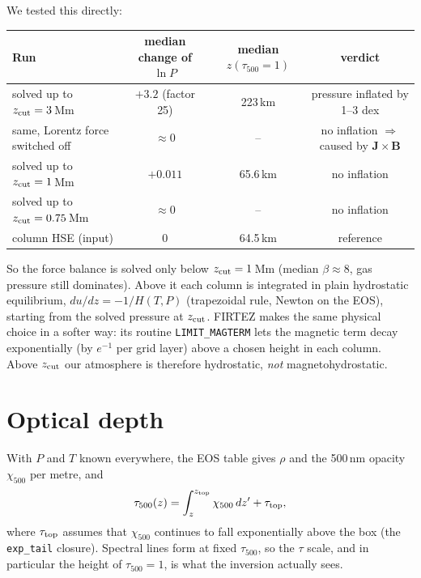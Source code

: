 \documentclass[10pt]{extarticle}
\newcommand{\B}{\mathbf B}\newcommand{\J}{\mathbf J}\newcommand{\F}{\mathbf F}\newcommand{\zh}{\hat{\mathbf z}}
\begin{document}
We tested this directly:
\begin{center}
\begin{tabular}{lccc}
\toprule
Run & median change of $\ln P$ & median $z(\tau_{500}=1)$ & verdict \\ \midrule
solved up to $z_{\rm cut}=3$\,Mm & $+3.2$ (factor 25) & 223\,km & pressure inflated by 1--3 dex \\
same, Lorentz force switched off & $\approx0$ & -- & no inflation $\Rightarrow$ caused by $\J\times\B$ \\
solved up to $z_{\rm cut}=1$\,Mm & $+0.011$ & 65.6\,km & no inflation \\
solved up to $z_{\rm cut}=0.75$\,Mm & $\approx0$ & -- & no inflation \\
column HSE (input) & 0 & 64.5\,km & reference \\
\bottomrule
\end{tabular}
\end{center}
So the force balance is solved only below $z_{\rm cut}=1$\,Mm (median $\beta\approx8$, gas pressure still dominates).
Above it each column is integrated in plain hydrostatic equilibrium, $du/dz=-1/H(T,P)$ (trapezoidal rule, Newton on the
EOS), starting from the solved pressure at $z_{\rm cut}$. FIRTEZ makes the same physical choice in a softer way: its
routine \texttt{LIMIT\_MAGTERM} lets the magnetic term decay exponentially (by $e^{-1}$ per grid layer) above a chosen
height in each column. Above $z_{\rm cut}$ our atmosphere is therefore hydrostatic, \emph{not} magnetohydrostatic.

\section{Optical depth}
With $P$ and $T$ known everywhere, the EOS table gives $\rho$ and the 500\,nm opacity $\chi_{500}$ per metre, and
\[
\tau_{500}(z)=\int_z^{z_{\rm top}}\chi_{500}\,dz' + \tau_{\rm top},
\]
where $\tau_{\rm top}$ assumes that $\chi_{500}$ continues to fall exponentially above the box (the \texttt{exp\_tail}
closure). Spectral lines form at fixed $\tau_{500}$, so the $\tau$ scale, and in particular the height of
$\tau_{500}=1$, is what the inversion actually sees.
\end{document}
